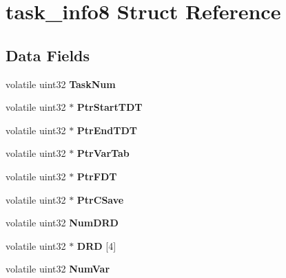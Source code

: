 \hypertarget{structtask__info8}{}\section{task\+\_\+info8 Struct Reference}
\label{structtask__info8}
\subsection*{Data Fields}
\begin{DoxyCompactItemize}
\item 
\mbox{\label{structtask__info8_aa38c395b73e7d7ae56ddeba544425db2}} 
volatile uint32 {\bfseries Task\+Num}
\item 
\mbox{\label{structtask__info8_ad534c2624b0937d3ad5c6f777aa5ba61}} 
volatile uint32 $\ast$ {\bfseries Ptr\+Start\+T\+DT}
\item 
\mbox{\label{structtask__info8_a62fd6dcf89c9009f2e154ad4feb6d912}} 
volatile uint32 $\ast$ {\bfseries Ptr\+End\+T\+DT}
\item 
\mbox{\label{structtask__info8_aa67fb465c01713548150e01a4ca2c18e}} 
volatile uint32 $\ast$ {\bfseries Ptr\+Var\+Tab}
\item 
\mbox{\label{structtask__info8_a963f50dcdab901eb13604215736833e4}} 
volatile uint32 $\ast$ {\bfseries Ptr\+F\+DT}
\item 
\mbox{\label{structtask__info8_a636a1221ea71b9f6992935b35beab46d}} 
volatile uint32 $\ast$ {\bfseries Ptr\+C\+Save}
\item 
\mbox{\label{structtask__info8_a15890a4a0ade2c2d4965f060284ce93a}} 
volatile uint32 {\bfseries Num\+D\+RD}
\item 
\mbox{\label{structtask__info8_ab9c2f746c9b9cd381cb8c675864c72b0}} 
volatile uint32 $\ast$ {\bfseries D\+RD} \mbox{[}4\mbox{]}
\item 
\mbox{\label{structtask__info8_ad8cf0fa641b26d4e9904ef3c00df603e}} 
volatile uint32 {\bfseries Num\+Var}
\item 

\end{DoxyCompactItemize}
